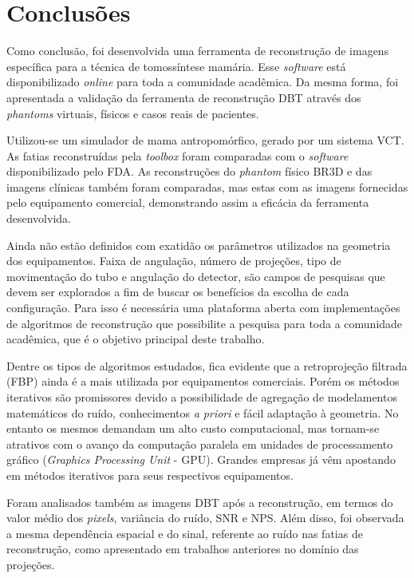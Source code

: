 \chapter[Conclusões]{Conclusões}\label{Capitulo7}

Como conclusão, foi desenvolvida uma ferramenta de reconstrução de imagens específica para a técnica de tomossíntese mamária. Esse \textit{software} está disponibilizado \textit{online} para toda a comunidade acadêmica. Da mesma forma, foi apresentada a validação da ferramenta de reconstrução \acs{DBT} através dos \textit{phantoms} virtuais, físicos e casos reais de pacientes.  

Utilizou-se um simulador de mama antropomórfico, gerado por um sistema \acs{VCT}. As fatias reconstruídas pela \textit{toolbox} foram comparadas com o \textit{software} disponibilizado pelo \acs{FDA}. As reconstruções do \textit{phantom} físico BR3D e das imagens clínicas também foram comparadas, mas estas com as imagens fornecidas pelo equipamento comercial, demonstrando assim a eficácia da ferramenta desenvolvida. 

Ainda não estão definidos com exatidão os parâmetros utilizados na geometria dos equipamentos. Faixa de angulação, número de projeções, tipo de movimentação do tubo e angulação do detector, são campos de pesquisas que devem ser explorados a fim de buscar os benefícios da escolha de cada configuração. Para isso é necessária uma plataforma aberta com implementações de algoritmos de reconstrução que possibilite a pesquisa para toda a comunidade acadêmica, que é o objetivo principal deste trabalho.     

Dentre os tipos de algoritmos estudados, fica evidente que a retroprojeção filtrada (\acs{FBP}) ainda é a mais utilizada por equipamentos comerciais. Porém os métodos iterativos são promissores devido a possibilidade de agregação de modelamentos matemáticos do ruído, conhecimentos \textit{a priori} e fácil adaptação à geometria. No entanto os mesmos demandam um alto custo computacional, mas tornam-se atrativos com o avanço da computação paralela em unidades de processamento gráfico (\textit{Graphics Processing Unit} - \acs{GPU}). Grandes empresas já vêm apostando em métodos iterativos para seus respectivos equipamentos.

Foram analisados também as imagens \acs{DBT} após a reconstrução, em termos do valor médio dos \textit{pixels}, variância do ruído, \acs{SNR} e \acs{NPS}. Além disso, foi observada a mesma dependência espacial e do sinal, referente ao ruído nas fatias de reconstrução, como apresentado em trabalhos anteriores no domínio das projeções.

